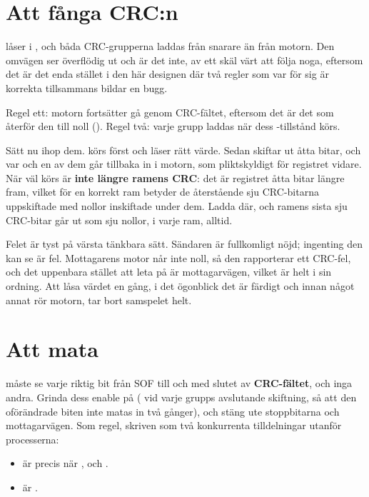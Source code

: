 \section{Att fånga CRC:n}
\label{c16:sec:crccapture}

 låser  i , och båda CRC-grupperna laddas från
 snarare än från motorn. Den omvägen ser överflödig ut och är det inte, av ett skäl värt
att följa noga, eftersom det är det enda stället i den här designen där två regler som var för sig är
korrekta tillsammans bildar en bugg.

Regel ett: motorn fortsätter gå genom CRC-fältet, eftersom det är det som återför den till noll
(). Regel två: varje grupp laddas när dess -tillstånd
körs.

Sätt nu ihop dem.  körs först och läser rätt värde. Sedan skiftar
 ut åtta bitar, och var och en av dem går tillbaka in i motorn, som pliktskyldigt
för registret vidare. När  väl körs är  \textbf{inte längre
ramens CRC}: det är registret åtta bitar längre fram, vilket för en korrekt ram betyder de
återstående sju CRC-bitarna uppskiftade med nollor inskiftade under dem. Ladda
 där, och ramens sista sju CRC-bitar går ut som sju nollor, i varje ram,
alltid.

Felet är tyst på värsta tänkbara sätt. Sändaren är fullkomligt nöjd; ingenting den kan se är fel.
Mottagarens motor når inte noll, så den rapporterar ett CRC-fel, och det uppenbara stället att leta
på är mottagarvägen, vilket är helt i sin ordning. Att låsa värdet en gång, i det ögonblick det är
färdigt och innan något annat rör motorn, tar bort samspelet helt.

\section{Att mata }
\label{c16:sec:crcfeed}

 måste se varje riktig bit från SOF till och med slutet av \textbf{CRC-fältet}, och inga
andra. Grinda dess enable på  ( vid varje grupps avslutande
skiftning, så att den oförändrade biten inte matas in två gånger), och stäng ute stoppbitarna och
mottagarvägen. Som regel, skriven som två konkurrenta tilldelningar utanför processerna:
\begin{itemize}
  \item {} är  precis när ,
     och .
  \item {} är .
\end{itemize}

